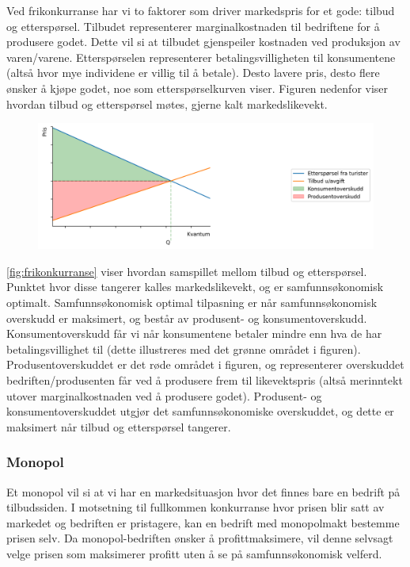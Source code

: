 \documentclass[
  12pt,
  a4paper,
  DIV=11,
  numbers=noendperiod]{scrartcl}
\begin{document}
Ved frikonkurranse har vi to faktorer som driver markedspris for et
gode: tilbud og etterspørsel. Tilbudet representerer marginalkostnaden
til bedriftene for å produsere godet. Dette vil si at tilbudet
gjenspeiler kostnaden ved produksjon av varen/varene. Etterspørselen
representerer betalingsvilligheten til konsumentene (altså hvor mye
individene er villig til å betale). Desto lavere pris, desto flere
ønsker å kjøpe godet, noe som etterspørselkurven viser. Figuren nedenfor
viser hvordan tilbud og etterspørsel møtes, gjerne kalt markedslikevekt.

\begin{figure}[h!]
\centering
  \includegraphics[width=\linewidth]{dokumentobjekter/figurer/frikonkurranse.png}
  \label{fig:frikonkurranse}
\end{figure}

\autoref{fig:frikonkurranse} viser hvordan samspillet mellom tilbud og
etterspørsel. Punktet hvor disse tangerer kalles markedslikevekt, og er
samfunnsøkonomisk optimalt. Samfunnsøkonomisk optimal tilpasning er når
samfunnsøkonomisk overskudd er maksimert, og består av produsent- og
konsumentoverskudd. Konsumentoverskudd får vi når konsumentene betaler
mindre enn hva de har betalingsvillighet til (dette illustreres med det
grønne området i figuren). Produsentoverskuddet er det røde området i
figuren, og representerer overskuddet bedriften/produsenten får ved å
produsere frem til likevektspris (altså merinntekt utover
marginalkostnaden ved å produsere godet). Produsent- og
konsumentoverskuddet utgjør det samfunnsøkonomiske overskuddet, og dette
er maksimert når tilbud og etterspørsel tangerer.

\subsubsection{Monopol}\label{monopol}

Et monopol vil si at vi har en markedsituasjon hvor det finnes bare en
bedrift på tilbudssiden. I motsetning til fullkommen konkurranse hvor
prisen blir satt av markedet og bedriften er pristagere, kan en bedrift
med monopolmakt bestemme prisen selv. Da monopol-bedriften ønsker å
profittmaksimere, vil denne selvsagt velge prisen som maksimerer profitt
uten å se på samfunnsøkonomisk velferd.
\end{document}
